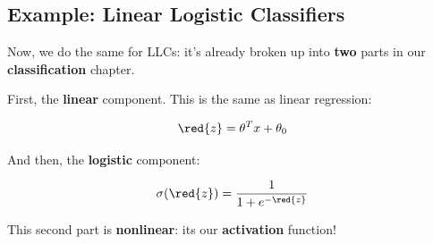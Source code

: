    \subsection{Example: Linear Logistic Classifiers}
    
        Now, we do the same for LLCs: it's already broken up into \textbf{two} parts in our \textbf{classification} chapter.
        
        First, the \textbf{linear} component. This is the same as linear regression:
        
        \begin{equation}
            \red{z} = 
            \theta^T x + \theta_0
        \end{equation}
        
        And then, the \textbf{logistic} component:
        
        \begin{equation}
            \sigma(\red{z}) = \frac{1}{1+e^{-\red{z}}}
        \end{equation}
        
        This second part is \textbf{nonlinear}: its our \textbf{activation} function!\\
        
